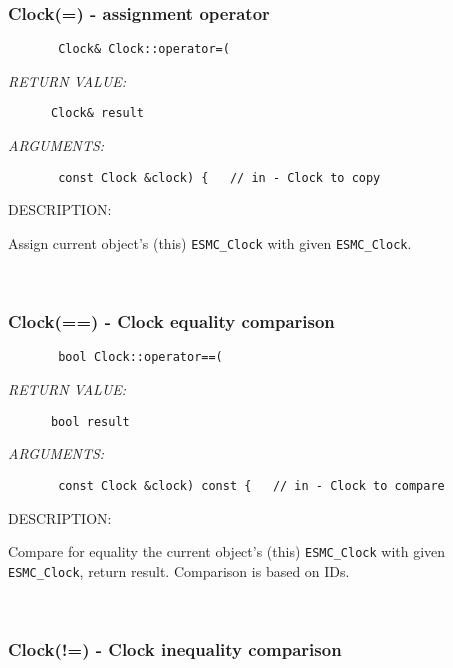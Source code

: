 \subsubsection [Clock(=)] {Clock(=) - assignment operator}


  
\begin{verbatim}       Clock& Clock::operator=(\end{verbatim}{\em RETURN VALUE:}
\begin{verbatim}      Clock& result\end{verbatim}{\em ARGUMENTS:}
\begin{verbatim}       const Clock &clock) {   // in - Clock to copy\end{verbatim}
{\sf DESCRIPTION:\\ }


        Assign current object's (this) {\tt ESMC\_Clock} with given
        {\tt ESMC\_Clock}.   
 
\mbox{}\hrulefill\ 
 
\subsubsection [Clock(==)] {Clock(==) - Clock equality comparison}


   
\begin{verbatim}       bool Clock::operator==(
     \end{verbatim}{\em RETURN VALUE:}
\begin{verbatim}      bool result\end{verbatim}{\em ARGUMENTS:}
\begin{verbatim}       const Clock &clock) const {   // in - Clock to compare\end{verbatim}
{\sf DESCRIPTION:\\ }


        Compare for equality the current object's (this) {\tt ESMC\_Clock} with
        given {\tt ESMC\_Clock}, return result.  Comparison is based on IDs.
      
 
\mbox{}\hrulefill\ 
 
\subsubsection [Clock(!=)] {Clock(!=) - Clock inequality comparison}


